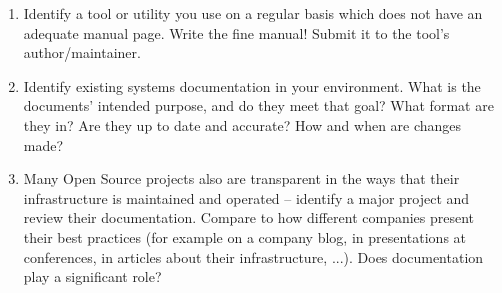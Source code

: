 \begin{enumerate}
\item
Identify a tool or utility you use on a regular basis which does not have
an adequate manual page.  Write the fine manual!  Submit it to the tool's
author/maintainer.

\item
Identify existing systems documentation in your environment.  What is the
documents' intended purpose, and do they meet that goal?  What format are
they in?  Are they up to date and accurate?  How and when are changes
made?

\item
Many Open Source projects also are transparent in the ways that their
infrastructure is maintained and operated -- identify a major project and
review their documentation.  Compare to how different companies present
their best practices (for example on a company blog, in presentations at
conferences, in articles about their infrastructure, ...).  Does
documentation play a significant role?

\end{enumerate}

\pagebreak

